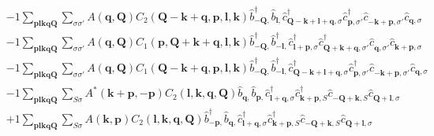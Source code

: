 \begin{align*}
	&-1 \sum_{ \mathbf{p} \mathbf{l} \mathbf{k} \mathbf{q} \mathbf{Q} } \sum_{ \sigma \sigma' } A( \mathbf{q}, \mathbf{Q} )  C_2( \mathbf{Q}-\mathbf{k}+\mathbf{q}, \mathbf{p}, \mathbf{l}, \mathbf{k} )   \hat{b}_{ -\mathbf{Q}, }^\dagger  \hat{b}_{ \mathbf{l}, }^{\phantom{\dagger}} \hat{c}_{ \mathbf{Q}-\mathbf{k}+\mathbf{l}+\mathbf{q}, \sigma }^\dagger  \hat{c}_{ \mathbf{p}, \sigma' }^\dagger  \hat{c}_{ -\mathbf{k}+\mathbf{p}, \sigma' }^{\phantom{\dagger}} \hat{c}_{ \mathbf{q}, \sigma }^{\phantom{\dagger}}  \\
	&-1 \sum_{ \mathbf{p} \mathbf{l} \mathbf{k} \mathbf{q} \mathbf{Q} } \sum_{ \sigma \sigma' } A( \mathbf{q}, \mathbf{Q} )  C_1( \mathbf{p}, \mathbf{Q}+\mathbf{k}+\mathbf{q}, \mathbf{l}, \mathbf{k} )   \hat{b}_{ -\mathbf{Q}, }^\dagger  \hat{b}_{ -\mathbf{l}, }^\dagger  \hat{c}_{ \mathbf{l}+\mathbf{p}, \sigma }^\dagger  \hat{c}_{ \mathbf{Q}+\mathbf{k}+\mathbf{q}, \sigma' }^\dagger  \hat{c}_{ \mathbf{q}, \sigma' }^{\phantom{\dagger}} \hat{c}_{ \mathbf{k}+\mathbf{p}, \sigma }^{\phantom{\dagger}}  \\
	&-1 \sum_{ \mathbf{p} \mathbf{l} \mathbf{k} \mathbf{q} \mathbf{Q} } \sum_{ \sigma \sigma' } A( \mathbf{q}, \mathbf{Q} )  C_1( \mathbf{Q}-\mathbf{k}+\mathbf{q}, \mathbf{p}, \mathbf{l}, \mathbf{k} )   \hat{b}_{ -\mathbf{Q}, }^\dagger  \hat{b}_{ -\mathbf{l}, }^\dagger  \hat{c}_{ \mathbf{Q}-\mathbf{k}+\mathbf{l}+\mathbf{q}, \sigma }^\dagger  \hat{c}_{ \mathbf{p}, \sigma' }^\dagger  \hat{c}_{ -\mathbf{k}+\mathbf{p}, \sigma' }^{\phantom{\dagger}} \hat{c}_{ \mathbf{q}, \sigma }^{\phantom{\dagger}}  \\
	&-1 \sum_{ \mathbf{p} \mathbf{l} \mathbf{k} \mathbf{q} \mathbf{Q} } \sum_{ S \sigma } A^*( \mathbf{k}+\mathbf{p}, -\mathbf{p} )  C_2( \mathbf{l}, \mathbf{k}, \mathbf{q}, \mathbf{Q} )   \hat{b}_{ \mathbf{q}, }^{\phantom{\dagger}} \hat{b}_{ \mathbf{p}, }^{\phantom{\dagger}} \hat{c}_{ \mathbf{l}+\mathbf{q}, \sigma }^\dagger  \hat{c}_{ \mathbf{k}+\mathbf{p}, S }^\dagger  \hat{c}_{ -\mathbf{Q}+\mathbf{k}, S }^{\phantom{\dagger}} \hat{c}_{ \mathbf{Q}+\mathbf{l}, \sigma }^{\phantom{\dagger}}  \\
	&+1 \sum_{ \mathbf{p} \mathbf{l} \mathbf{k} \mathbf{q} \mathbf{Q} } \sum_{ S \sigma } A( \mathbf{k}, \mathbf{p} )  C_2( \mathbf{l}, \mathbf{k}, \mathbf{q}, \mathbf{Q} )   \hat{b}_{ -\mathbf{p}, }^\dagger  \hat{b}_{ \mathbf{q}, }^{\phantom{\dagger}} \hat{c}_{ \mathbf{l}+\mathbf{q}, \sigma }^\dagger  \hat{c}_{ \mathbf{k}+\mathbf{p}, S }^\dagger  \hat{c}_{ -\mathbf{Q}+\mathbf{k}, S }^{\phantom{\dagger}} \hat{c}_{ \mathbf{Q}+\mathbf{l}, \sigma }^{\phantom{\dagger}}  \\

\end{align*}
